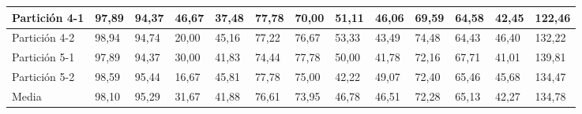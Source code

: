 \documentclass[10pt,a4paper]{article}
\begin{document}
\begin{table}[H]
{\begin{tabular}{l|l|l|l|l|l|l|l|l|l|l|l|l|}
\multicolumn{1}{|l|}{Partición 4-1} & 97,89        & 94,37         & 46,67   & 37,48 & 77,78        & 70,00         & 51,11   & 46,06 & 69,59        & 64,58         & 42,45   & 122,46 \\ \hline
\multicolumn{1}{|l|}{Partición 4-2} & 98,94        & 94,74         & 20,00   & 45,16 & 77,22        & 76,67         & 53,33   & 43,49 & 74,48        & 64,43         & 46,40   & 132,22 \\ \hline
\multicolumn{1}{|l|}{Partición 5-1} & 97,89        & 94,37         & 30,00   & 41,83 & 74,44        & 77,78         & 50,00   & 41,78 & 72,16        & 67,71         & 41,01   & 139,81 \\ \hline
\multicolumn{1}{|l|}{Partición 5-2} & 98,59        & 95,44         & 16,67   & 45,81 & 77,78        & 75,00         & 42,22   & 49,07 & 72,40        & 65,46         & 45,68   & 134,47 \\ \hline
\multicolumn{1}{|l|}{Media}         & 98,10        & 95,29         & 31,67   & 41,88 & 76,61        & 73,95         & 46,78   & 46,51 & 72,28        & 65,13         & 42,27   & 134,78 \\ \hline
\end{tabular}}
\end{table}
\end{document}
